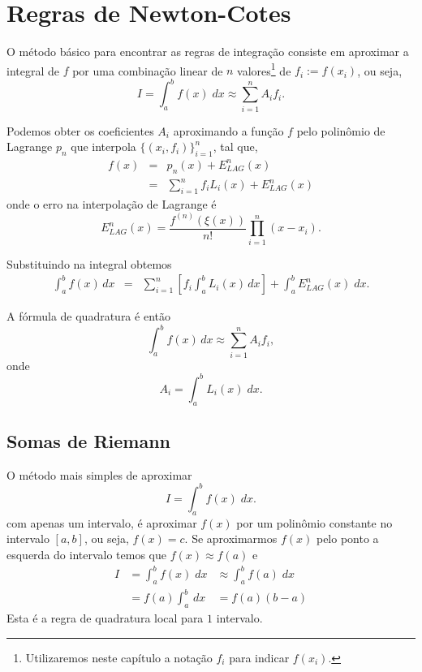 \section{Regras de Newton-Cotes}

O método básico para encontrar as regras de integração consiste em aproximar a integral de $f$ por uma combinação linear de $n$ valores\footnote{Utilizaremos neste capítulo a notação $f_i$ para indicar $f(x_i)$.} de $f_i := f(x_i)$, ou seja,
$$
 I = \int_a^b f(x) \;dx \approx \sum_{i=1}^nA_if_i.
$$


Podemos obter os coeficientes $A_i$ aproximando a função $f$ pelo polinômio de Lagrange $p_n$ que interpola $\{(x_i,f_i)\}_{i=1}^n$, tal que, 
\begin{eqnarray}
  f(x) &=& p_n(x)+E^n_{LAG}(x) \\
       &=& \sum_{i=1}^n f_iL_i(x)+E^n_{LAG}(x) 
\end{eqnarray}
onde o erro na interpolação de Lagrange é
\begin{equation}
   E^n_{LAG}(x)=\frac{f^{(n)}(\xi(x))}{n!}\prod_{i=1}^n(x-x_i).
\end{equation}

Substituindo na integral obtemos
\begin{eqnarray}
  \int_a^bf(x)\,dx &=& \sum_{i=1}^n\left[f_i\int_a^bL_i(x)\,dx\right] +  \int_a^b E^n_{LAG}(x) \;dx.
\end{eqnarray}


A fórmula de quadratura é então 
\begin{equation}
\int_a^bf(x)\,dx\approx\sum_{i=1}^nA_if_i,
\end{equation}
onde
\begin{equation}
A_i=\int_a^b L_i(x)\;dx.
\end{equation}


\subsection{Somas de Riemann}
O método mais simples de aproximar 
$$
 I = \int_a^b f(x) \;dx.
$$
com apenas um intervalo, é aproximar $f(x)$ por um polinômio constante no intervalo $[a,b]$, ou seja, $f(x)=c$. Se aproximarmos $f(x)$ pelo ponto a esquerda do intervalo temos que $f(x)\approx f(a)$ e
\begin{eqnarray}
 I &= \int_a^b f(x) \;dx 
   &\approx \int_a^b f(a) \;dx \\
   &= f(a) \int_a^b\,dx 
   &= f(a) (b-a)
\end{eqnarray}
Esta é a regra de quadratura local para $1$ intervalo.

